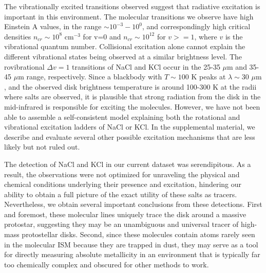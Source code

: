 \documentclass[12pt]{article}
\newcommand{\percc}{\ensuremath{\textrm{cm}^{-3}}\xspace}
\newcommand{\um}{\ensuremath{\mu \textrm{m}}\xspace}    %
\begin{document}
The vibrationally excited transitions observed suggest that radiative excitation is important in this environment.  The molecular transitions we observe have high Einstein A values, in the range $\sim10^{-3}-10^0$, and correspondingly high critical densities $n_{cr} \sim10^{8}$ \percc for v=0 and $n_{cr} \sim 10^{12}$ for $v>=1$, where $v$ is the vibrational quantum number.  Collisional excitation alone cannot explain the different vibrational states being observed at a similar brightness level. The rovibrational $\Delta v=1$ transitions of NaCl and KCl occur in the 25-35 \um and 35-45 \um range, respectively.  Since a blackbody with $T\sim100$ K peaks at $\lambda\sim30$ \um, and the observed disk brightness temperature is around 100-300 K at the radii where salts are observed, it is plausible that strong radiation from the disk in the mid-infrared is responsible for exciting the molecules.  However, we have not been able to assemble a self-consistent model explaining both the rotational and vibrational excitation ladders of NaCl or KCl.  In the supplemental material, we describe  and evaluate several other possible excitation mechanisms that are less likely but not ruled out.

The detection of NaCl and KCl in our current dataset was serendipitous.  As a result, the observations were not optimized for unraveling the physical and chemical conditions underlying their presence and excitation, hindering our ability to obtain a full picture of the exact utility of these salts as tracers.  Nevertheless, we obtain several important conclusions from these detections.  First and foremost, these molecular lines uniquely trace the disk around a massive protostar, suggesting they may be an unambiguous and universal tracer of high-mass protostellar disks. Second, since these molecules contain atoms rarely seen in the molecular ISM because they are trapped in dust, they may serve as a tool for directly measuring absolute metallicity in an environment that is typically far too chemically complex and obscured for other methods to work.




\end{document}
